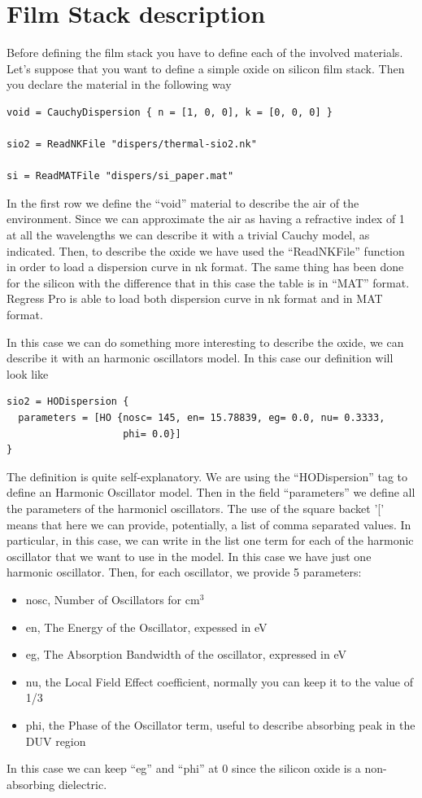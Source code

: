 \documentclass[a4paper]{report}
\begin{document}
\section{Film Stack description}
Before defining the film stack you have to define each of the involved
materials. Let's suppose that you want to define a simple oxide on
silicon film stack. Then you declare the material in the following way
\begin{verbatim}
void = CauchyDispersion { n = [1, 0, 0], k = [0, 0, 0] }

sio2 = ReadNKFile "dispers/thermal-sio2.nk"

si = ReadMATFile "dispers/si_paper.mat"
\end{verbatim}
In the first row we define the ``void'' material to describe the air
of the environment. Since we can approximate the air as having a
refractive index of 1 at all the wavelengths we can describe it with a
trivial Cauchy model, as indicated. Then, to describe the oxide we
have used the ``ReadNKFile'' function in order to load a dispersion
curve in nk format. The same thing has been done for the silicon with
the difference that in this case the table is in ``MAT''
format. Regress Pro is able to load both dispersion curve in nk format
and in MAT format.

In this case we can do something more interesting to describe the
oxide, we can describe it with an harmonic oscillators model. In this
case our definition will look like
\begin{verbatim}
sio2 = HODispersion {
  parameters = [HO {nosc= 145, en= 15.78839, eg= 0.0, nu= 0.3333,
                    phi= 0.0}]
}
\end{verbatim}
The definition is quite self-explanatory. We are using the
``HODispersion'' tag to define an Harmonic Oscillator model. Then in
the field ``parameters'' we define all the parameters of the harmonicl
oscillators. The use of the square backet '[' means that here we can
provide, potentially, a list of comma separated values. In particular,
in this case, we can write in the list one term for each of the
harmonic oscillator that we want to use in the model. In this case we
have just one harmonic oscillator. Then, for each oscillator, we
provide 5 parameters:
\begin{itemize}
  \item nosc, Number of Oscillators for $\textrm{cm}^3$
  \item en, The Energy of the Oscillator, expessed in eV
  \item eg, The Absorption Bandwidth of the oscillator, expressed in
  eV
  \item nu, the Local Field Effect coefficient, normally you can keep
  it to the value of 1/3
  \item phi, the Phase of the Oscillator term, useful to describe
  absorbing peak in the DUV region
\end{itemize}
In this case we can keep ``eg'' and ``phi'' at 0 since the silicon
oxide is a non-absorbing dielectric.
\end{document}
